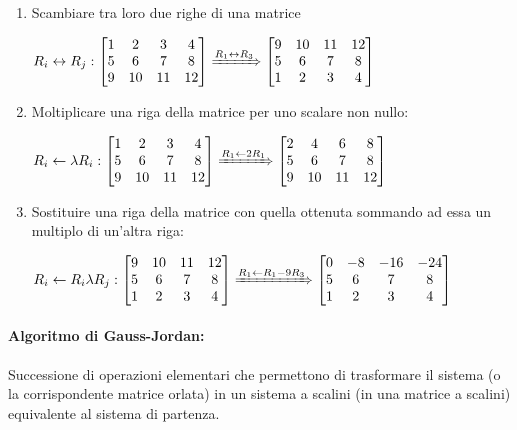 \documentclass{article}
\begin{document}
\begin{enumerate}[label=\Roman*.]
	\item Scambiare tra loro due righe di una matrice

	  $R_i\leftrightarrow R_j:
		\begin{bmatrix}
			1 & 2  & 3  & 4  \\
			5 & 6  & 7  & 8  \\
			9 & 10 & 11 & 12
		  \end{bmatrix}\xRightarrow{R_1\leftrightarrow R_3}\begin{bmatrix}
			9 & 10 & 11 & 12 \\
			5 & 6  & 7  & 8  \\
			1 & 2  & 3  & 4
		\end{bmatrix}$

	\item Moltiplicare una riga della matrice per uno scalare non nullo:

	  $R_i\leftarrow\lambda R_i:
		\begin{bmatrix}
			1 & 2  & 3  & 4  \\
			5 & 6  & 7  & 8  \\
			9 & 10 & 11 & 12
		  \end{bmatrix}\xRightarrow{R_1\leftarrow2R_1}\begin{bmatrix}
			2 & 4  & 6  & 8  \\
			5 & 6  & 7  & 8  \\
			9 & 10 & 11 & 12
		\end{bmatrix}$


	\item Sostituire una riga della matrice con quella ottenuta sommando ad essa un multiplo di un'altra riga:

	  $R_i\leftarrow R_i\lambda R_j:
		\begin{bmatrix}
			9 & 10 & 11 & 12 \\
			5 & 6  & 7  & 8  \\
			1 & 2  & 3  & 4
		  \end{bmatrix}\xRightarrow{R_1\leftarrow R_1-9R_3}\begin{bmatrix}
			0 & -8 & -16 & -24 \\
			5 & 6  & 7   & 8   \\
			1 & 2  & 3   & 4
		\end{bmatrix}$
\end{enumerate}

\paragraph*{Algoritmo di Gauss-Jordan:}
Successione di operazioni elementari che permettono di trasformare il sistema (o la corrispondente matrice orlata) in un sistema a scalini (in una matrice a scalini) equivalente al sistema di partenza.
\end{document}
